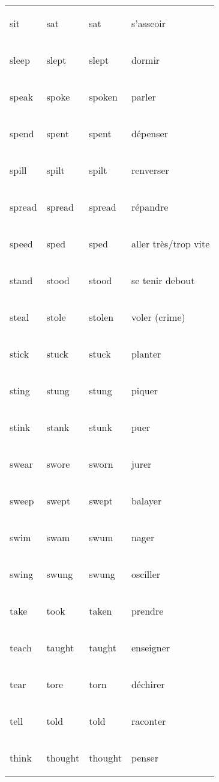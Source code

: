 \documentclass[
]{article}
\begin{document}
\begin{longtable}{>{\bfseries\raggedright\arraybackslash}p{3cm}ll>{\bfseries\raggedright\arraybackslash}p{3cm}}
\rowcolor{gray!6}  sit & sat & sat & s'asseoir\\

sleep & slept & slept & dormir\\

\rowcolor{gray!6}  speak & spoke & spoken & parler\\

spend & spent & spent & dépenser\\

\rowcolor{gray!6}  spill & spilt & spilt & renverser\\

spread & spread & spread & répandre\\

\rowcolor{gray!6}  speed & sped & sped & aller très/trop vite\\

stand & stood & stood & se tenir debout\\

\rowcolor{gray!6}  steal & stole & stolen & voler (crime)\\

stick & stuck & stuck & planter\\

\rowcolor{gray!6}  sting & stung & stung & piquer\\

stink & stank & stunk & puer\\

\rowcolor{gray!6}  swear & swore & sworn & jurer\\

sweep & swept & swept & balayer\\

\rowcolor{gray!6}  swim & swam & swum & nager\\

swing & swung & swung & osciller\\

\rowcolor{gray!6}  take & took & taken & prendre\\

teach & taught & taught & enseigner\\

\rowcolor{gray!6}  tear & tore & torn & déchirer\\

tell & told & told & raconter\\

\rowcolor{gray!6}  think & thought & thought & penser\\


\end{longtable}
\end{document}
